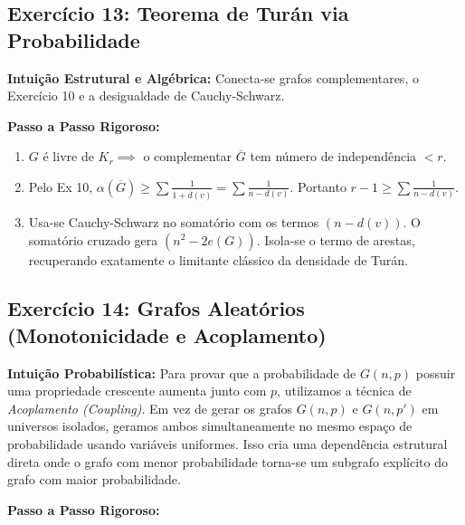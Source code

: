 \documentclass[11pt, a4paper]{article}
\begin{document}
\subsection*{Exercício 13: Teorema de Turán via Probabilidade}
\textbf{Intuição Estrutural e Algébrica:} Conecta-se grafos complementares, o Exercício 10 e a desigualdade de Cauchy-Schwarz.

\textbf{Passo a Passo Rigoroso:}
\begin{enumerate}
    \item $G$ é livre de $K_r \implies$ o complementar $\overline{G}$ tem número de independência $< r$.
    \item Pelo Ex 10, $\alpha(\overline{G}) \ge \sum \frac{1}{1+\overline{d}(v)} = \sum \frac{1}{n-d(v)}$. Portanto $r-1 \ge \sum \frac{1}{n-d(v)}$.
    \item Usa-se Cauchy-Schwarz no somatório com os termos $(n-d(v))$. O somatório cruzado gera $(n^2 - 2e(G))$. Isola-se o termo de arestas, recuperando exatamente o limitante clássico da densidade de Turán.
\end{enumerate}

\subsection{Exercício 14: Grafos Aleatórios (Monotonicidade e Acoplamento)}
\textbf{Intuição Probabilística:} Para provar que a probabilidade de $G(n,p)$ possuir uma propriedade crescente aumenta junto com $p$, utilizamos a técnica de \textit{Acoplamento (Coupling)}. Em vez de gerar os grafos $G(n,p)$ e $G(n,p')$ em universos isolados, geramos ambos simultaneamente no mesmo espaço de probabilidade usando variáveis uniformes. Isso cria uma dependência estrutural direta onde o grafo com menor probabilidade torna-se um subgrafo explícito do grafo com maior probabilidade.

\textbf{Passo a Passo Rigoroso:}
\end{document}
